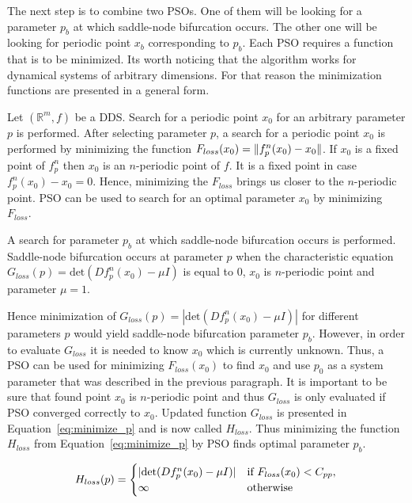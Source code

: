 \par
The next step is to combine two PSOs.
One of them will be looking for a parameter $p_b$ at which saddle-node bifurcation occurs.
The other one will be looking for periodic point $x_b$ corresponding to $p_b$.
Each PSO requires a function that is to be minimized.
Its worth noticing that the algorithm works for dynamical systems of arbitrary dimensions.
For that reason the minimization functions are presented in a general form.
\par
Let $(\mathbb{R}^{m}, f)$ be a DDS.
Search for a periodic point $x_0$ for an arbitrary parameter $p$ is performed.
After selecting parameter $p$, a search for a periodic point $x_0$ is performed by minimizing the function $F_{loss}(x_0) = \lVert f^{n}_{p}(x_0)-x_0\rVert$.
If $x_0$ is a fixed point of $f^{n}_{p}$ then $x_0$ is an $n$-periodic point of $f$.
It is a fixed point in case $f^{n}_{p}(x_0)-x_0 = 0$.
Hence, minimizing the $F_{loss}$ brings us closer to the $n$-periodic point.
PSO can be used to search for an optimal parameter $x_0$ by minimizing $F_{loss}$.
\par
A search for parameter $p_b$ at which saddle-node bifurcation occurs is performed.
Saddle-node bifurcation occurs at parameter $p$ when the characteristic equation $G_{loss}(p) = \text{det}(Df^{n}_{p}(x_0)-\mu I)$ is equal to $0$, $x_0$ is $n$-periodic point and parameter $\mu = 1$.
\par
Hence minimization of $G_{loss}(p) = |\text{det}(Df^{n}_{p}(x_0)-\mu I)|$ for different parameters $p$ would yield saddle-node bifurcation parameter $p_b$.
However, in order to evaluate $G_{loss}$ it is needed to know $x_0$ which is currently unknown.
Thus, a PSO can be used for minimizing $F_{loss}(x_{0})$ to find $x_0$ and use $p_0$ as a system parameter that was described in the previous paragraph.
It is important to be sure that found point $x_0$ is $n$-periodic point and thus $G_{loss}$ is only evaluated if PSO converged correctly to $x_0$.
Updated function $G_{loss}$ is presented in Equation~\eqref{eq:minimize_p} and is now called $H_{loss}$.
Thus minimizing the function $H_{loss}$ from Equation~\eqref{eq:minimize_p} by PSO finds optimal parameter $p_b$.

\begin{equation}
\label{eq:minimize_p}
    H_{loss}(p) =
    \begin{cases}
        |\text{det}(Df^{n}_{p}(x_0)-\mu I)| & \text{if } F_{loss}(x_0) < C_{pp}, \\
        \infty & \rm{otherwise}
    \end{cases}
\end{equation}

